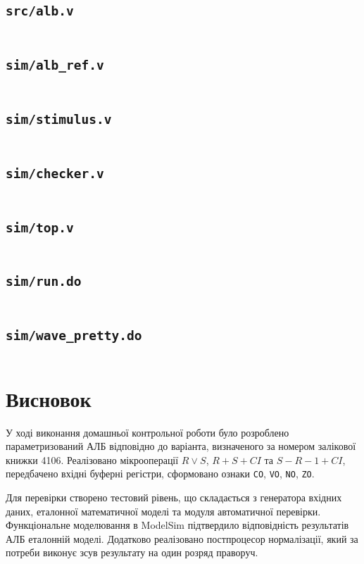 \documentclass[12pt,a4paper]{article}
\begin{document}
\subsection*{\texttt{src/alb.v}}

\inputminted{verilog}{Davydchuk_Dubrov_Mega_Lab_ALB/src/alb.v}

\subsection*{\texttt{sim/alb\_ref.v}}

\inputminted{verilog}{Davydchuk_Dubrov_Mega_Lab_ALB/sim/alb_ref.v}

\subsection*{\texttt{sim/stimulus.v}}

\inputminted{verilog}{Davydchuk_Dubrov_Mega_Lab_ALB/sim/stimulus.v}

\subsection*{\texttt{sim/checker.v}}

\inputminted{verilog}{Davydchuk_Dubrov_Mega_Lab_ALB/sim/checker.v}

\subsection*{\texttt{sim/top.v}}

\inputminted{verilog}{Davydchuk_Dubrov_Mega_Lab_ALB/sim/top.v}

\subsection*{\texttt{sim/run.do}}

\inputminted{text}{Davydchuk_Dubrov_Mega_Lab_ALB/sim/run.do}

\subsection*{\texttt{sim/wave\_pretty.do}}

\inputminted{text}{Davydchuk_Dubrov_Mega_Lab_ALB/sim/wave_pretty.do}

\section*{Висновок}

У ході виконання домашньої контрольної роботи було розроблено параметризований АЛБ відповідно до варіанта, визначеного за номером залікової книжки 4106. Реалізовано мікрооперації $R \vee S$, $R + S + CI$ та $S - R - 1 + CI$, передбачено вхідні буферні регістри, сформовано ознаки \texttt{CO}, \texttt{VO}, \texttt{NO}, \texttt{ZO}.

Для перевірки створено тестовий рівень, що складається з генератора вхідних даних, еталонної математичної моделі та модуля автоматичної перевірки. Функціональне моделювання в ModelSim підтвердило відповідність результатів АЛБ еталонній моделі. Додатково реалізовано постпроцесор нормалізації, який за потреби виконує зсув результату на один розряд праворуч.
\end{document}

